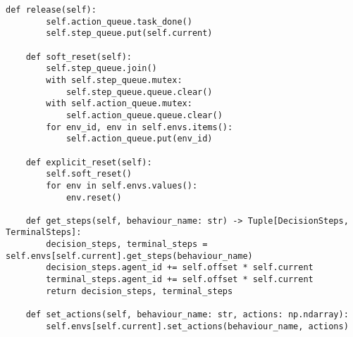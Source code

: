\begin{lstlisting}[basicstyle=\footnotesize]
    def release(self):
        self.action_queue.task_done()
        self.step_queue.put(self.current)

    def soft_reset(self):
        self.step_queue.join()
        with self.step_queue.mutex:
            self.step_queue.queue.clear()
        with self.action_queue.mutex:
            self.action_queue.queue.clear()
        for env_id, env in self.envs.items():
            self.action_queue.put(env_id)

    def explicit_reset(self):
        self.soft_reset()
        for env in self.envs.values():
            env.reset()

    def get_steps(self, behaviour_name: str) -> Tuple[DecisionSteps, TerminalSteps]:
        decision_steps, terminal_steps = self.envs[self.current].get_steps(behaviour_name)
        decision_steps.agent_id += self.offset * self.current
        terminal_steps.agent_id += self.offset * self.current
        return decision_steps, terminal_steps

    def set_actions(self, behaviour_name: str, actions: np.ndarray):
        self.envs[self.current].set_actions(behaviour_name, actions)

\end{lstlisting}